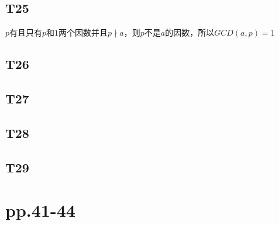 \documentclass{article}
\begin{document}
\subsection{T25}
$p$有且只有$p$和$1$两个因数并且$p \nmid a$，则$p$不是$a$的因数，所以$GCD(a, p) = 1$\\

\subsection{T26}
\subsection{T27}
\subsection{T28}
\subsection{T29}

\section{pp.41-44}
\end{document}
